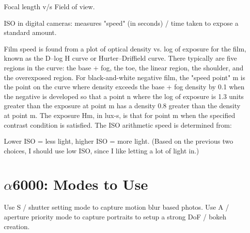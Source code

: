 \documentclass[11pt]{book}
\begin{document}
Focal length v/s Field of view.

ISO in digital cameras: measures "speed" (in seconds) / time taken to expose a standard amount.

Film speed is found from a plot of optical density vs. log of exposure for the film, known as the D–log H curve or Hurter–Driffield curve.
There typically are five regions in the curve: the base + fog, the toe, the linear region, the shoulder, and the overexposed region.
For black-and-white negative film, the "speed point" m is the point on the curve where density exceeds the base + fog density by 0.1 when the negative is developed so
that a point n where the log of exposure is 1.3 units greater than the exposure at point m has a density 0.8 greater than the density at point m.
The exposure Hm, in lux-s, is that for point m when the specified contrast condition is satisfied. The ISO arithmetic speed is determined from:

Lower ISO = less light, higher ISO = more light.
(Based on the previous two choices, I should use low ISO, since I like letting a lot of light in.)



\chapter{$\alpha$6000: Modes to Use}

Use S / shutter setting mode to capture motion blur based photos.
Use A / aperture priority mode to capture portraits to setup a strong DoF / bokeh creation.
\end{document}
